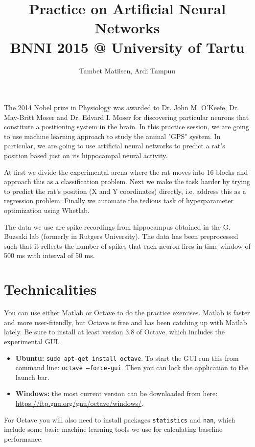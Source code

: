 \documentclass[a4paper,11pt]{article}
\author{\large{Tambet Matiisen, Ardi Tampuu}}
\title{\huge{Practice on Artificial Neural Networks}\\\LARGE{BNNI 2015 @ University of Tartu}}
\begin{document}
\maketitle

%
%
The 2014 Nobel prize in Physiology was awarded to Dr. John M. O'Keefe, Dr. May-Britt Moser and Dr. Edvard I. Moser for discovering particular neurons that constitute a positioning system in the brain. In this practice session, we are going to use machine learning approach to study the animal "GPS" system. In particular, we are going to use artificial neural networks to predict a rat's position based just on its hippocampal neural activity.

At first we divide the experimental arena where the rat moves into 16 blocks and approach this as a classification problem. Next we make the task harder by trying to predict the rat's position (X and Y coordinates) directly, i.e. address this as a regression problem. Finally we automate the tedious task of hyperparameter optimization using Whetlab. 

The data we use are spike recordings from hippocampus obtained in the G. Buzsaki lab (formerly in Rutgers University). The data has been preprocessed such that it reflects the number of spikes that each neuron fires in time window of 500 ms with interval of 50 ms.

%
%
\section{Technicalities}

You can use either Matlab or Octave to do the practice exercises. Matlab is faster and more user-friendly, but Octave is free and has been catching up with Matlab lately. Be sure to install at least version 3.8 of Octave, which includes the experimental GUI.
\begin{itemize}
	\item \textbf{Ubuntu:} \texttt{sudo apt-get install octave}. To start the GUI run this from command line: \texttt{octave --force-gui}. Then you can lock the application to the launch bar. 
	\item \textbf{Windows:} the most current version can be downloaded from here:\\ \url{https://ftp.gnu.org/gnu/octave/windows/}.
\end{itemize}

For Octave you will also need to install packages \texttt{statistics} and \texttt{nan}, which include some basic machine learning tools we use for calculating baseline performance. 
\end{document}

